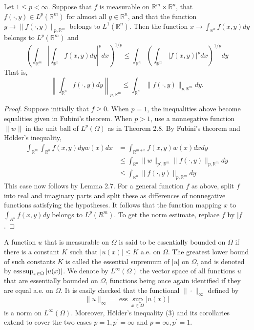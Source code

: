 \begin{theorem}
  Let $1 \leq p<\infty$. Suppose that $f$ is measurable on $\mathbb{R}^m \times \mathbb{R}^n$, 
  that $f(\cdot, y) \in L^p\left(\mathbb{R}^m\right)$ for almost all $y \in \mathbb{R}^n$,
  and that the function $y \rightarrow\|f(\cdot, y)\|_{p, \mathbb{R}^m}$ belongs to $L^1(\mathbb{R}^n)$. Then the function $x \rightarrow \int_{\mathbb{R}^n} f(x, y) d y$ belongs to $L^p\left(\mathbb{R}^m\right)$ and
  \[
  \left(\int_{\mathbb{R}^m}\left|\int_{\mathbb{R}^n} f(x, y) d y\right|^p d x\right)^{1 / p} \leq \int_{\mathbb{R}^n}\left(\int_{\mathbb{R}^m}|f(x, y)|^p d x\right)^{1 / p} d y
  \]
  That is,
  \[
  \left\|\int_{\mathbb{R}^n} f(\cdot, y) d y\right\|_{p, \mathbb{R}^m} \leq \int_{\mathbb{R}^n}\|f(\cdot, y)\|_{p, \mathbb{R}^m} d y .
  \]
\end{theorem}

\begin{proof}
  Suppose initially that $f \geq 0$. When $p=1$, the inequalities above become equalities given in Fubini's theorem. When $p>1$, use a nonnegative function $\|w\|$ in the unit ball of $L^p(\Omega)$ as in Theorem 2.8. By Fubini's theorem and Hölder's inequality,
  \[
  \begin{aligned}
  \int_{\mathbb{R}^m} \int_{\mathbb{R}^n} f(x, y) d y w(x) d x & =\int_{\mathbb{R}^{m+n}} f(x, y) w(x) d x d y \\
  & \leq \int_{\mathbb{R}^n}\|w\|_{p^{\prime}, \mathbb{R}^m}\|f(\cdot, y)\|_{p, \mathbb{R}^m} d y \\
  & \leq \int_{\mathbb{R}^n}\|f(\cdot, y)\|_{p, \mathbb{R}^m} d y
  \end{aligned}
  \]
  This case now follows by Lemma 2.7. For a general function $f$ as above, split $f$ into real and imaginary parts and split these as differences of nonnegative functions satisfying the hypotheses. It follows that the function mapping $x$ to $\int_{R^n} f(x, y) d y$ belongs to $L^p\left(R^m\right)$. To get the norm estimate, replace $f$ by $|f|$.
\end{proof}


\begin{para}
  A function $u$ that is measurable on $\Omega$ is said to be essentially bounded on $\Omega$ if 
  there is a constant $K$ such that $|u(x)| \leq K$ a.e. on $\Omega$. The greatest lower bound of 
  such constants $K$ is called the essential supremum of $|u|$ on $\Omega$, and is denoted by
  $\operatorname{ess\,sup}_{x \in \Omega}|u(x)|$. We denote by $L^{\infty}(\Omega)$ the vector space of all functions $u$ that are essentially bounded on $\Omega$, functions being once again identified if they are equal a.e. on $\Omega$. It is easily checked that the functional $\|\cdot\|_{\infty}$ defined by
  \[
  \|u\|_{\infty}=\operatorname{ess} \sup _{x \in \Omega}|u(x)|
  \]
  is a norm on $L^{\infty}(\Omega)$. Moreover, Hölder's inequality (3) and its corollaries extend to cover the two cases $p=1, p^{\prime}=\infty$ and $p=\infty, p^{\prime}=1$.
\end{para}

